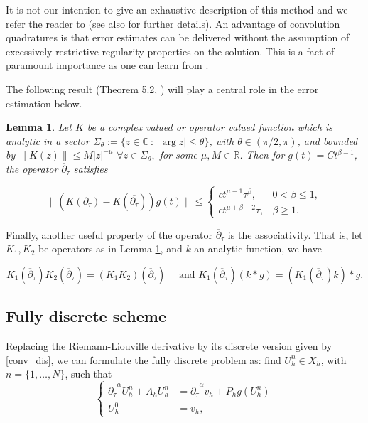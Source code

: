 \documentclass{amsart}
\newcommand{\pp}{\overline{\partial}}
\newcommand{\dt}{\partial_{\tau}}
\newcommand{\dtd}{\overline{\partial_{\tau}}}
\newcommand{\fmonio}{g}
\newtheorem{lemma}[theorem]{Lemma}
\theoremstyle{remark}
\theoremstyle{definition}
\numberwithin{equation}{section}
\begin{document}
 It is not our intention to give an exhaustive description of this method and we refer the reader to \cite{Jin, parabolico} (see also   \cite{Lub1, Lub2} for further details). An advantage of convolution quadratures  is that  error estimates can be delivered without the assumption of excessively restrictive regularity properties on the solution. This is a fact of paramount importance as one can learn from  \cite{stynes}. 
 

The following result  (Theorem 5.2, \cite{Lub2}) will play a central role in the error estimation below.

\begin{lemma}
\label{lem:est_lubich}
Let $K$ be a complex valued or operator valued function which is analytic in a sector $\Sigma_{\theta}:=\{z \in \mathbb{C}\, : \, |\arg z| \leq \theta \}$, with $\theta \in (\pi/2 , \pi )$, and bounded by $\|K(z)\| \leq M|z|^{-\mu} \, \, \forall z \in \Sigma_{\theta},$
for some $\mu, M \in \mathbb{R}$. Then for $g(t) = Ct^{\beta-1}$, the operator $\pp_{\tau}$ satisfies 

\begin{equation*}
\| (K(\dt) - K(\dtd))g(t)\| \leq
\left\lbrace
  \begin{array}{ll}
      ct^{\mu -1}\tau^{\beta}, & 0<\beta \leq 1, \\
      ct^{\mu + \beta -2}\tau, & \beta \geq 1 .
      \end{array}
\right.
\label{estimacion_lubich}
\end{equation*}  
 
\end{lemma}  

Finally, another useful property of the operator $\pp_{\tau}$ is the associativity. That is, let $K_1, K_2$ be operators as in Lemma \ref{lem:est_lubich}, and $k$ an analytic function, we have 

\begin{equation}
\label{eq:asociatividad}
K_1(\pp_{\tau})K_2(\pp_{\tau}) = (K_1 K_2)(\pp_{\tau}) \quad \text{ and } K_1(\pp_{\tau})(k*g) = (K_1(\pp_{\tau})k)*g. 
\end{equation}     


\subsection{Fully discrete scheme}

Replacing the Riemann-Liouville derivative by its discrete version given by \eqref{conv_dis}, we can formulate the fully discrete problem as: find $U^n_{h} \in X_h$, with $n = \{1,\ldots,N \}$, such that  
\begin{equation} 
\left\lbrace
  \begin{array}{rl}
      \dtd^{\alpha} U_h^n   +  A_h U_h^n & =  \dtd^{\alpha}v_h +  P_h \fmonio(U^n_h) \\
      U_h^0 & = v_h, 
      \end{array}
\label{fully_AC_rl}
\right.
\end{equation}
\end{document}
